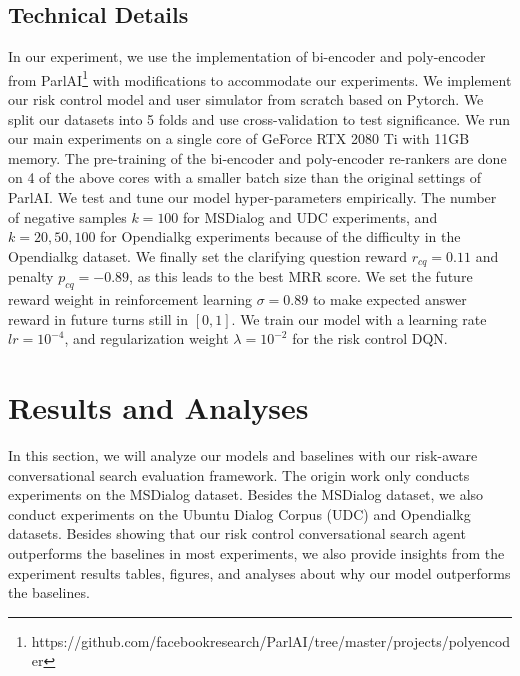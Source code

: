 \documentclass[format=acmsmall, review=False, screen=true]{acmart}
\begin{document}
\subsection{Technical Details}
In our experiment, we use the implementation of bi-encoder and poly-encoder from ParlAI\footnote{https://github.com/facebookresearch/ParlAI/tree/master/projects/polyencoder} with modifications to accommodate our experiments. We implement our risk control model and user simulator from scratch based on Pytorch. We split our datasets into 5 folds and use cross-validation to test significance. We run our main experiments on a single core of GeForce RTX 2080 Ti with 11GB memory. The pre-training of the bi-encoder and poly-encoder re-rankers are done on 4 of the above cores with a smaller batch size than the original settings of ParlAI. We test and tune our model hyper-parameters empirically. The number of negative samples $k=100$ for MSDialog and UDC experiments, and $k=20,50,100$ for Opendialkg experiments because of the difficulty in the Opendialkg dataset. We finally set the clarifying question reward $r_{cq}=0.11$ and penalty $p_{cq}=-0.89$, as this leads to the best MRR score. We set the future reward weight in reinforcement learning $\sigma = 0.89$ to make expected answer reward in future turns still in $[0,1]$. We train our model with a learning rate $lr=10^{-4}$, and regularization weight $\lambda=10^{-2}$ for the risk control DQN.

\section{Results and Analyses}

In this section, we will analyze our models and baselines with our risk-aware conversational search evaluation framework. The origin work \cite{wang2021controlling} only conducts experiments on the MSDialog dataset. Besides the MSDialog dataset, we also conduct experiments on the Ubuntu Dialog Corpus (UDC) and Opendialkg datasets. Besides showing that our risk control conversational search agent outperforms the baselines in most experiments, we also provide insights from the experiment results tables, figures, and analyses about why our model outperforms the baselines.
\end{document}

